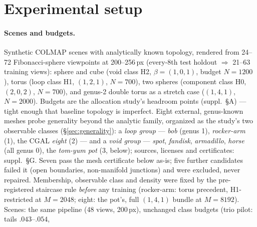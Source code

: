 \section{Experimental setup}
\label{sec:setup}


\paragraph{Scenes and budgets.} Synthetic COLMAP scenes with analytically
known topology, rendered from 24--72 Fibonacci-sphere viewpoints at
200--256\,px (every-8th test holdout $\Rightarrow$ 21--63 training
views): sphere and cube
(void class H2, $\beta{=}(1,0,1)$, budget $N{=}1200$), torus (loop class H1,
$(1,2,1)$, $N{=}700$), two spheres (component class H0, $(2,0,2)$, $N{=}700$),
and genus-2 double torus as a stretch case ($(1,4,1)$, $N{=}2000$). Budgets
are the allocation study's headroom points (suppl.\ \S A) --- tight
enough that baseline topology is imperfect.
Eight external, genus-known meshes probe generality beyond the analytic
family, organized as the study's two observable classes
(\S\ref{sec:generality}): a \emph{loop group} --- \emph{bob} (genus 1),
\emph{rocker-arm} (1), the CGAL \emph{eight} (2) --- and a \emph{void
group} --- \emph{spot}, \emph{fandisk}, \emph{armadillo}, \emph{horse}
(all genus 0), the \emph{tom-yum pot} (3, below); sources, licenses and
certificates: suppl.\ \S G. Seven pass the mesh certificate below
as-is; five further
candidates failed it (open boundaries, non-manifold junctions) and were
excluded, never repaired. Membership, observable class and density were fixed by the
pre-registered staircase rule \emph{before} any training (rocker-arm:
torus precedent, H1-restricted at $M{=}2048$; eight: the pot's, full
$(1,4,1)$ bundle at $M{=}8192$). Scenes: the same pipeline (48 views,
200\,px), unchanged class budgets (trio pilot: tails $.043$--$.054$,
